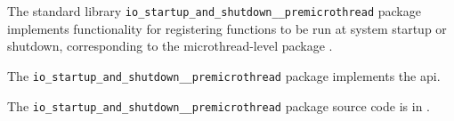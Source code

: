 
The standard library {\tt io\_startup\_and\_shutdown\_\_premicrothread} package implements functionality for registering 
functions to be run at system startup or shutdown, corresponding to the microthread-level package .

The {\tt io\_startup\_and\_shutdown\_\_premicrothread} package implements the  api.

The {\tt io\_startup\_and\_shutdown\_\_premicrothread} package source code is in .
